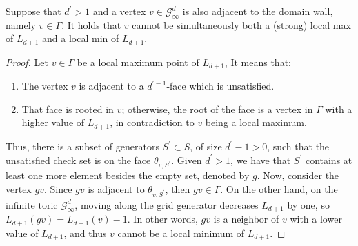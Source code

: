 \begin{claim}\label{claim:extermal}
Suppose that $d^{\prime} > 1$ and a vertex $v \in \mathcal{G}^{d}_{\infty}$ is also adjacent to the domain wall, namely $v \in \Gamma$. It holds that $v$ cannot be simultaneously both a (strong) local max of $L_{d+1}$ and a local min of $L_{d+1}$.
\end{claim}

\begin{proof}
  Let $v \in \Gamma$ be a local maximum point of $L_{d+1}$, It means that:
  \begin{enumerate}
    \item The vertex $v$ is adjacent to a $d^{\prime - 1}$-face which is unsatisfied. 
   \item That face is rooted in $v$; otherwise, the root of the face is a vertex in $\Gamma$ with a higher value of $L_{d+1}$, in contradiction to $v$ being a local maximum.
  \end{enumerate}
Thus, there is a subset of generators $S^{\prime} \subset S$, of size $d^{\prime} - 1 > 0$, such that the unsatisfied check set is on the face $\theta_{v,S^{\prime}}$. Given $d^{\prime} > 1$, we have that $S^{\prime}$ contains at least one more element besides the empty set, denoted by $g$. Now, consider the vertex $gv$. Since $gv$ is adjacent to $\theta_{v,S^{\prime}}$, then $gv \in \Gamma$. On the other hand, on the infinite toric $\mathcal{G}^{d}_{\infty}$, moving along the grid generator decreases $L_{d+1}$ by one, so $L_{d+1}(gv) = L_{d+1}(v) - 1$. In other words, $gv$ is a neighbor of $v$ with a lower value of $L_{d+1}$, and thus $v$ cannot be a local minimum of $L_{d+1}$.
\end{proof}

\begin{remark}

\end{remark}

